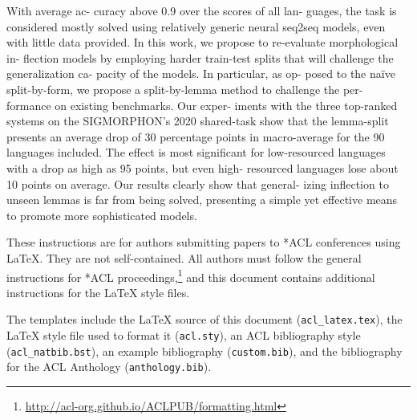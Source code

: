 \documentclass[11pt]{article}
\begin{document}
With average ac- curacy above 0.9 over the scores of all lan- guages, the task is considered mostly solved using relatively generic neural seq2seq models, even with little data provided. In this work, we propose to re-evaluate morphological in- flection models by employing harder train-test splits that will challenge the generalization ca- pacity of the models. In particular, as op- posed to the naïve split-by-form, we propose a split-by-lemma method to challenge the per- formance on existing benchmarks. Our exper- iments with the three top-ranked systems on the SIGMORPHON’s 2020 shared-task show that the lemma-split presents an average drop of 30 percentage points in macro-average for the 90 languages included. The effect is most significant for low-resourced languages with a drop as high as 95 points, but even high- resourced languages lose about 10 points on average. Our results clearly show that general- izing inflection to unseen lemmas is far from being solved, presenting a simple yet effective means to promote more sophisticated models.





These instructions are for authors submitting papers to *ACL conferences using \LaTeX. They are not self-contained. All authors must follow the general instructions for *ACL proceedings,\footnote{\url{http://acl-org.github.io/ACLPUB/formatting.html}} and this document contains additional instructions for the \LaTeX{} style files.

The templates include the \LaTeX{} source of this document (\texttt{acl\_latex.tex}),
the \LaTeX{} style file used to format it (\texttt{acl.sty}),
an ACL bibliography style (\texttt{acl\_natbib.bst}),
an example bibliography (\texttt{custom.bib}),
and the bibliography for the ACL Anthology (\texttt{anthology.bib}).


\newpage
\end{document}
